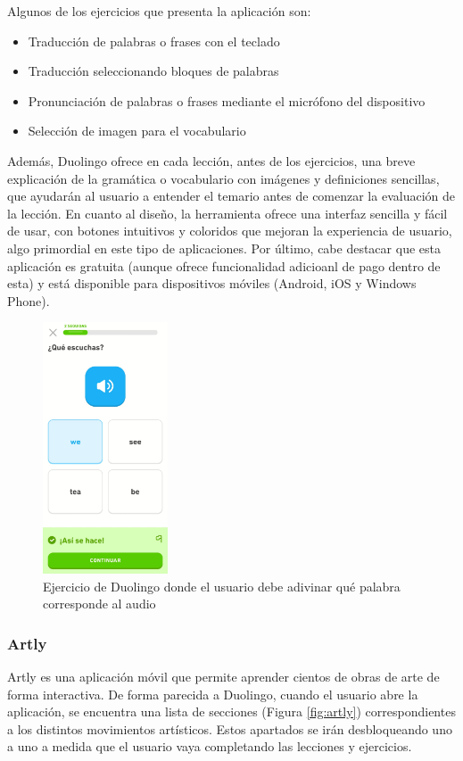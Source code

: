 Algunos de los ejercicios que presenta la aplicación son:
\begin{itemize}
    \item Traducción de palabras o frases con el teclado
    \item Traducción seleccionando bloques de palabras
    \item Pronunciación de palabras o frases mediante el micrófono del dispositivo
    \item Selección de imagen para el vocabulario
\end {itemize}
    Además, Duolingo ofrece en cada lección, antes de los ejercicios, una breve explicación de la gramática o vocabulario con
imágenes y definiciones sencillas, que ayudarán al usuario a entender el temario antes de comenzar la evaluación de la lección.
En cuanto al diseño, la herramienta ofrece una interfaz sencilla y fácil de usar, con botones intuitivos y coloridos que mejoran
la experiencia de usuario, algo primordial en este tipo de aplicaciones.
Por último, cabe destacar que esta aplicación es gratuita (aunque ofrece funcionalidad adicioanl de pago dentro de esta) y está disponible para dispositivos móviles (Android, iOS y Windows Phone).
\begin{figure}[H]
    \centering
    \includegraphics[width=0.33\textwidth]{imagenes/c2/duolingo.jpeg}
    \caption{Ejercicio de Duolingo donde el usuario debe adivinar qué palabra corresponde al audio}
    \label{fig:duolingo}
\end{figure} 


\subsubsection{Artly}
Artly es una aplicación móvil que permite aprender cientos de obras de arte de forma interactiva. De forma parecida a Duolingo, 
cuando el usuario abre la aplicación, se encuentra una lista de secciones (Figura \ref{fig:artly}) correspondientes a los distintos movimientos 
artísticos. Estos apartados se irán desbloqueando uno a uno a medida que el usuario vaya completando las lecciones y ejercicios.
 
